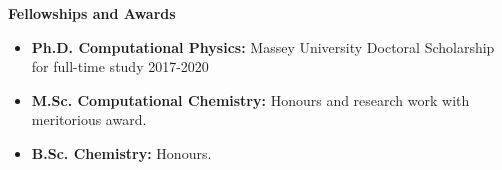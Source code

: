 {\bf\Large Fellowships \textcolor{my_blue}{and Awards}}\\ \vspace*{-6mm}

\begin{itemize}
    \itemsep-1mm
    \item {\bf Ph.D. Computational Physics:} Massey University Doctoral Scholarship
          for full-time study 2017-2020
    \item {\bf M.Sc. Computational Chemistry:} Honours and research work with
          meritorious award.
    \item {\bf B.Sc. Chemistry:} Honours.

\end{itemize}
